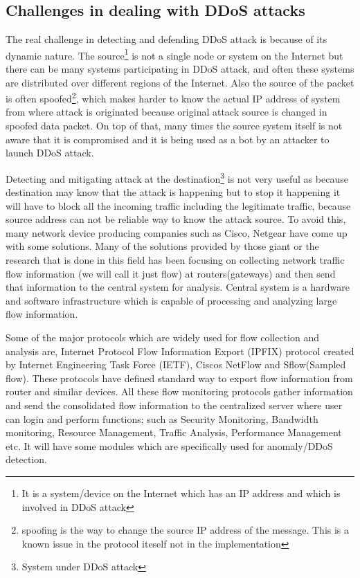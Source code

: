 \documentclass[12pt,oneside,a4paper]{article}
\begin{document}
\subsection{Challenges in dealing with DDoS attacks}
The real challenge in detecting and defending DDoS attack is because of its dynamic nature. The source\footnote{It is a system/device on the Internet which has an IP address and which is involved in DDoS attack} is not a single node or system on the Internet but there can be many systems participating in DDoS attack, and often these systems are distributed over different regions of the Internet. Also the source of the packet is often spoofed\footnote{spoofing is the way to change the source IP address of the message. This is a known issue in the protocol iteself not in the implementation}\cite{ip-spoofing}, which makes harder to know the actual IP address of system from where attack is originated because original attack source is changed in spoofed data packet. On top of that, many times the source system itself is not aware that it is compromised and it is being used as a bot\cite{bot} by an attacker to launch DDoS attack.

Detecting and mitigating attack at the destination\footnote{System under DDoS attack} is not very useful as because destination may know that the attack is happening but to stop it happening it will have to block all the incoming traffic including the legitimate traffic, because source address can not be reliable way to know the attack source. To avoid this, many network device producing companies such as Cisco, Netgear have come up with some solutions. Many of the solutions provided by those giant or the research that is done in this field has been focusing on collecting network traffic flow information\cite{network-traffic-flow} (we will call it just flow) at routers(gateways) and then send that information to the central system for analysis. Central system is a hardware and software infrastructure which is capable of processing and analyzing large flow information.\par

Some of the major protocols which are widely used for flow collection and analysis are, Internet Protocol Flow Information Export (IPFIX) protocol created by Internet Engineering Task Force (IETF), Ciscos NetFlow\cite{cisco-netflow} and Sflow(Sampled flow)\cite{sflow}. These protocols have defined standard way to export flow information from router and similar devices. All these flow monitoring protocols gather information and send the consolidated flow information to the centralized server where user can login and perform functions; such as Security Monitoring, Bandwidth monitoring, Resource Management, Traffic Analysis, Performance Management etc. It will have some modules which are specifically used for anomaly/DDoS detection.\par
\end{document}
